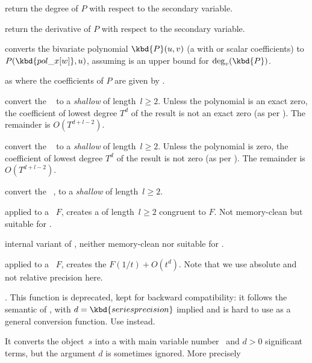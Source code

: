  return the degree of $P$ with respect to
the secondary variable.

 return the derivative of $P$ with respect to
the secondary variable.

 converts the bivariate polynomial
$\kbd{P}(u,v)$ (a  with  or scalar coefficients) to
$P(\kbd{pol\_x[w]},u)$, assuming  is an upper bound for
$\deg_v(\kbd{P})$.

as  where the coefficients of $P$ are given by
.

 convert the ~ to
a \emph{shallow}  of length~$l\geq 2$.
Unless the polynomial is an exact zero, the coefficient of lowest degree
$T^d$ of the result is not an exact zero (as per ). The
remainder is $O(T^{d+l-2})$.

 convert the ~ to
a \emph{shallow}  of length~$l\geq 2$.
Unless the polynomial is zero, the coefficient of lowest degree
$T^d$ of the result is not zero (as per ). The
remainder is $O(T^{d+l-2})$.

 convert the ~,
to a \emph{shallow}  of length~$l\geq 2$.

 applied to a ~$F$,
creates a  of length~$l\geq 2$ congruent to $F$. Not memory-clean
but suitable for .

 internal variant of
, neither memory-clean nor suitable for
.

 applied to a
~$F$, creates the  $F(1/t) + O(t^d)$. Note that
we use absolute and not relative precision here.

. This function is deprecated,
kept for backward compatibility: it follows the semantic of ,
with $d = \kbd{seriesprecision}$ implied and is hard to use as a general
conversion function. Use  instead.

It converts the object~$s$ into a  with main variable number~
and $d > 0$ significant terms, but the argument $d$ is sometimes ignored.
More precisely

